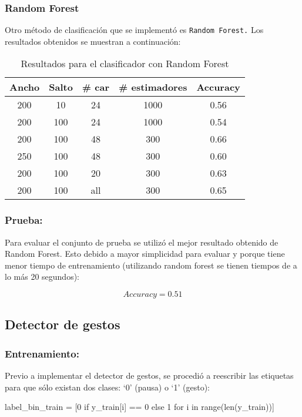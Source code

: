 \subsubsection{Random Forest}
\par Otro método de clasificación que se implementó es \texttt{Random Forest.} Los resultados obtenidos se muestran a continuación:

\begin{table}[H]
\centering
\begin{tabular}{|c|c|c|c|c|}
\hline
\textbf{Ancho} & \textbf{Salto} & \textbf{\# car} &\textbf{\# estimadores} & \textbf{Accuracy}   \\ \hline
200     & 10 &  24     & 1000     & 0.56   \\ \hline
200     & 100   & 24    & 1000  & 0.54   \\ \hline
200     & 100   & 48    & 300  & 0.66   \\ \hline
250     & 100   & 48    & 300  & 0.60   \\ \hline
200     & 100   & 20    & 300  & 0.63   \\ \hline
200     & 100   & all    & 300  & 0.65   \\ \hline
\end{tabular}
\caption{Resultados para el clasificador con Random Forest}
\label{tab:rf}
\end{table}

\subsubsection*{Prueba:}
\par Para evaluar el conjunto de prueba se utilizó el mejor resultado obtenido de Random Forest. Esto debido a mayor simplicidad para evaluar y porque tiene menor tiempo de entrenamiento (utilizando random forest se tienen tiempos de a lo más 20 segundos):

\begin{equation*}
    Accuracy = 0.51
\end{equation*}



\subsection{Detector de gestos}
\subsubsection*{Entrenamiento:}
\par Previo a implementar el detector de gestos, se procedió a reescribir las etiquetas para que sólo existan dos clases: `0' (pausa) o `1' (gesto):
\begin{python}
label_bin_train = [0 if y_train[i] == 0 else 1 for i in range(len(y_train))]
\end{python}

